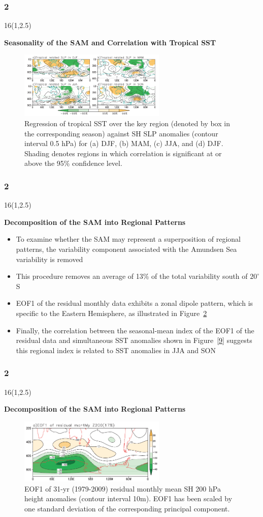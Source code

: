 \documentclass{beamer}
\newcommand\FrameText[1]{
\begin{textblock}{16}(1,2.5)
\raggedright #1
\end{textblock}}
\begin{document}
\begin{frame}
\frametitle{2}
\FrameText{\bf{\large Seasonality of the SAM and Correlation
with Tropical SST}}
\begin{figure}
\centering
\includegraphics[width=7cm]{7.png}
\caption{\tiny Regression of tropical SST over the key region (denoted by box in the corresponding season)
against SH SLP anomalies (contour interval 0.5 hPa) for (a) DJF, (b) MAM, (c) JJA, and (d) DJF. Shading denotes
regions in which correlation is significant at or above the 95\% confidence level.}
\label{7}
\end{figure}
\end{frame}

\begin{frame}
\frametitle{2}
\FrameText{\bf{\large Decomposition of the SAM into Regional Patterns}}
\begin{itemize}
\item To examine whether the SAM may represent a superposition
  of regional patterns, the variability component associated with the
  Amundsen Sea variability is removed
\item This procedure removes an average of 13\% of the total
  variability south of $20^{\circ}$S
\item EOF1 of the residual monthly data exhibits a zonal dipole
  pattern, which is specific to the Eastern Hemisphere, as illustrated
  in Figure~\ref{8}
\item Finally, the correlation between the seasonal-mean index of
the EOF1 of the residual data and simultaneous SST anomalies shown in
Figure~\ref{9} suggests this regional index is related to SST
anomalies in JJA and SON
\end{itemize}
\end{frame}

\begin{frame}
\frametitle{2}
\FrameText{\bf{\large Decomposition of the SAM into Regional Patterns}}
\begin{figure}
\centering
\includegraphics[width=7cm]{8.png}
\caption{\tiny EOF1 of 31-yr (1979-2009) residual monthly mean SH 200 hPa height anomalies
(contour interval 10m). EOF1 has been scaled by one standard deviation of the corresponding
principal component.}
\label{8}
\end{figure}
\end{frame}
\end{document}
